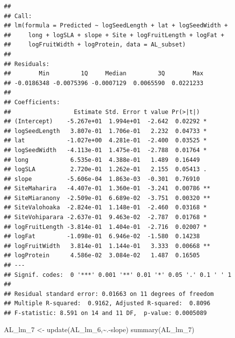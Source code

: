 \documentclass[
  12pt,
]{article}
\newenvironment{Shaded}{\begin{snugshade}}{\end{snugshade}}
\newcommand{\FunctionTok}[1]{\textcolor[rgb]{0.00,0.00,0.00}{#1}}
\newcommand{\NormalTok}[1]{#1}
\newcommand{\OtherTok}[1]{\textcolor[rgb]{0.56,0.35,0.01}{#1}}
\newcommand{\SpecialCharTok}[1]{\textcolor[rgb]{0.00,0.00,0.00}{#1}}
\begin{document}
\begin{verbatim}
## 
## Call:
## lm(formula = Predicted ~ logSeedLength + lat + logSeedWidth + 
##     long + logSLA + slope + Site + logFruitLength + logFat + 
##     logFruitWidth + logProtein, data = AL_subset)
## 
## Residuals:
##        Min         1Q     Median         3Q        Max 
## -0.0186348 -0.0075396 -0.0007129  0.0065590  0.0221233 
## 
## Coefficients:
##                  Estimate Std. Error t value Pr(>|t|)   
## (Intercept)    -5.267e+01  1.994e+01  -2.642  0.02292 * 
## logSeedLength   3.807e-01  1.706e-01   2.232  0.04733 * 
## lat            -1.027e+00  4.281e-01  -2.400  0.03525 * 
## logSeedWidth   -4.113e-01  1.475e-01  -2.788  0.01764 * 
## long            6.535e-01  4.388e-01   1.489  0.16449   
## logSLA          2.720e-01  1.262e-01   2.155  0.05413 . 
## slope          -5.606e-04  1.863e-03  -0.301  0.76910   
## SiteMaharira   -4.407e-01  1.360e-01  -3.241  0.00786 **
## SiteMiaranony  -2.509e-01  6.689e-02  -3.751  0.00320 **
## SiteValohoaka  -2.824e-01  1.148e-01  -2.460  0.03168 * 
## SiteVohiparara -2.637e-01  9.463e-02  -2.787  0.01768 * 
## logFruitLength -3.814e-01  1.404e-01  -2.716  0.02007 * 
## logFat         -1.098e-01  6.946e-02  -1.580  0.14238   
## logFruitWidth   3.814e-01  1.144e-01   3.333  0.00668 **
## logProtein      4.586e-02  3.084e-02   1.487  0.16505   
## ---
## Signif. codes:  0 '***' 0.001 '**' 0.01 '*' 0.05 '.' 0.1 ' ' 1
## 
## Residual standard error: 0.01663 on 11 degrees of freedom
## Multiple R-squared:  0.9162, Adjusted R-squared:  0.8096 
## F-statistic: 8.591 on 14 and 11 DF,  p-value: 0.0005089
\end{verbatim}

\begin{Shaded}
\begin{Highlighting}[]
\NormalTok{AL\_lm\_7 }\OtherTok{\textless{}{-}} \FunctionTok{update}\NormalTok{(AL\_lm\_6,}\SpecialCharTok{\textasciitilde{}}\NormalTok{.}\SpecialCharTok{{-}}\NormalTok{slope)}
\FunctionTok{summary}\NormalTok{(AL\_lm\_7)}
\end{Highlighting}
\end{Shaded}
\end{document}
